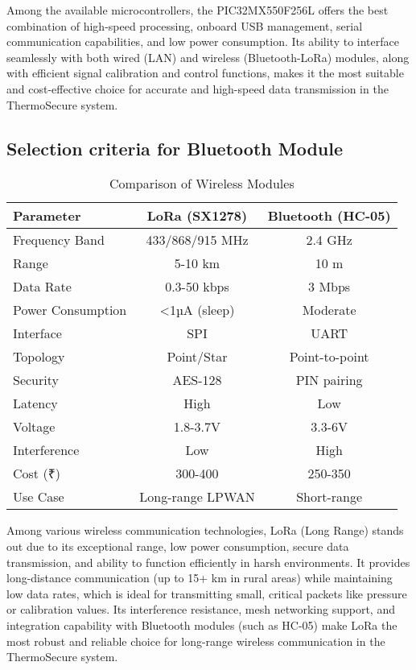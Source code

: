 \documentclass[12pt]{report}
\begin{document}
\begin{flushleft}
Among the available microcontrollers, the PIC32MX550F256L offers the best combination of high-speed processing, onboard USB management, serial communication capabilities, and low power consumption. Its ability to interface seamlessly with both wired (LAN) and wireless (Bluetooth-LoRa) modules, along with efficient signal calibration and control functions, makes it the most suitable and cost-effective choice for accurate and high-speed data transmission in the ThermoSecure system.
\end{flushleft}

\subsection{Selection criteria for Bluetooth Module}
\begin{table}[ht]
    \centering
    \caption{Comparison of Wireless Modules}
    \label{tab:bluetooth_comparison}
    \begin{tabular}{@{}>{\raggedright}p{3.2cm}cc@{}}
        \toprule
        \textbf{Parameter} & \textbf{LoRa (SX1278)} & \textbf{Bluetooth (HC-05)} \\
        \midrule
        Frequency Band & 433/868/915 MHz & 2.4 GHz \\
        Range & 5-10 km & 10 m \\
        Data Rate & 0.3-50 kbps & 3 Mbps \\
        Power Consumption & <1µA (sleep) & Moderate \\
        Interface & SPI & UART \\
        Topology & Point/Star & Point-to-point \\
        Security & AES-128 & PIN pairing \\
        Latency & High & Low \\
        Voltage & 1.8-3.7V & 3.3-6V \\
        Interference & Low & High \\
        Cost (₹) & 300-400 & 250-350 \\
        Use Case & Long-range LPWAN & Short-range \\
        \bottomrule
    \end{tabular}
\end{table}

\begin{flushleft}
Among various wireless communication technologies, LoRa (Long Range) stands out due to its exceptional range, low power consumption, secure data transmission, and ability to function efficiently in harsh environments. It provides long-distance communication (up to 15+ km in rural areas) while maintaining low data rates, which is ideal for transmitting small, critical packets like pressure or calibration values. Its interference resistance, mesh networking support, and integration capability with Bluetooth modules (such as HC-05) make LoRa the most robust and reliable choice for long-range wireless communication in the ThermoSecure system.
\end{flushleft}
\end{document}
